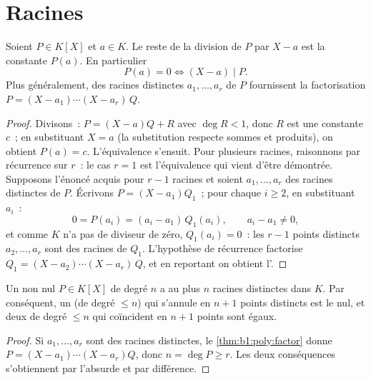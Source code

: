 \section{Racines}

\begin{theorem}\label{thm:b1:poly:factor}
Soient $P \in K[X]$ et $a \in K$. Le reste de la division de $P$ par
$X - a$ est la constante $P(a)$. En particulier
\[
P(a) = 0 \iff (X - a) \mid P .
\]
Plus généralement, des racines distinctes $a_1, \dots, a_r$ de $P$
fournissent la factorisation $P = (X - a_1)\cdots(X - a_r)\, Q$.
\end{theorem}

\begin{proof}
Divisons~: $P = (X - a) Q + R$ avec $\deg R < 1$, donc $R$ est une
constante $c$~; en substituant $X = a$ (la substitution respecte sommes
et produits), on obtient $P(a) = c$. L'équivalence s'ensuit. Pour
plusieurs racines, raisonnons par récurrence sur $r$~: le cas $r = 1$
est l'équivalence qui vient d'être démontrée. Supposons l'énoncé
acquis pour $r - 1$ racines et soient $a_1, \dots, a_r$ des racines
distinctes de $P$. Écrivons $P = (X - a_1)Q_1$~; pour chaque $i
\geq 2$, en substituant $a_i$~:
\[
0 = P(a_i) = (a_i - a_1)\,Q_1(a_i),
\qquad a_i - a_1 \neq 0 ,
\]
et comme $K$ n'a pas de diviseur de zéro, $Q_1(a_i) = 0$~: les $r -
1$ points distincts $a_2, \dots, a_r$ sont des racines de $Q_1$.
L'hypothèse de récurrence factorise $Q_1 = (X - a_2)\cdots(X -
a_r)\,Q$, et en reportant on obtient l'.
\end{proof}

\begin{corollary}\label{cor:b1:poly:nroots}
Un  non nul $P \in K[X]$ de degré $n$ a au plus $n$ racines
distinctes dans $K$. Par conséquent, un  (de degré $\leq n$)
qui s'annule en $n + 1$ points distincts est le  nul, et deux
 de degré $\leq n$ qui coïncident en $n+1$ points sont égaux.
\end{corollary}

\begin{proof}
Si $a_1, \dots, a_r$ sont des racines distinctes,
le \cref{thm:b1:poly:factor} donne $P = (X-a_1)\cdots(X-a_r) Q$, donc $n =
\deg P \geq r$. Les deux conséquences s'obtiennent par l'absurde et par
différence.
\end{proof}

